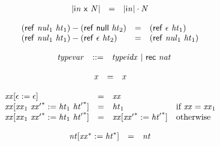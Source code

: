 $$
\begin{array}{@{}lcl@{}l@{}}
{|{\mathsf{i}}{{\mathit{n}}}~\mathsf{x}~{\mathit{N}}|} &=& {|{\mathsf{i}}{{\mathit{n}}}|} \cdot {\mathit{N}} &  \\
\end{array}
$$

\vspace{1ex}

$$
\begin{array}{@{}lcl@{}l@{}}
(\mathsf{ref}~{\mathit{nul}}_{{1}}~{\mathit{ht}}_{{1}}) - (\mathsf{ref}~\mathsf{null}~{\mathit{ht}}_{{2}}) &=& (\mathsf{ref}~\epsilon~{\mathit{ht}}_{{1}}) &  \\
(\mathsf{ref}~{\mathit{nul}}_{{1}}~{\mathit{ht}}_{{1}}) - (\mathsf{ref}~\epsilon~{\mathit{ht}}_{{2}}) &=& (\mathsf{ref}~{\mathit{nul}}_{{1}}~{\mathit{ht}}_{{1}}) &  \\
\end{array}
$$

\vspace{1ex}

$$
\begin{array}{@{}lrrl@{}l@{}}
& {\mathit{typevar}} &::=& {\mathit{typeidx}} ~|~ \mathsf{rec}~{\mathit{nat}} \\
\end{array}
$$

$$
\begin{array}{@{}lcl@{}l@{}}
{\mathit{x}} &=& {\mathit{x}} &  \\
\end{array}
$$

\vspace{1ex}

\vspace{1ex}

$$
\begin{array}{@{}lcl@{}l@{}}
{{\mathit{xx}}}{[\epsilon := \epsilon]} &=& {\mathit{xx}} &  \\
{{\mathit{xx}}}{[{\mathit{xx}}_{{1}}~{{\mathit{xx}'}^\ast} := {\mathit{ht}}_{{1}}~{{\mathit{ht}'}^\ast}]} &=& {\mathit{ht}}_{{1}} &\quad
  \mbox{if}~{\mathit{xx}} = {\mathit{xx}}_{{1}} \\
{{\mathit{xx}}}{[{\mathit{xx}}_{{1}}~{{\mathit{xx}'}^\ast} := {\mathit{ht}}_{{1}}~{{\mathit{ht}'}^\ast}]} &=& {{\mathit{xx}}}{[{{\mathit{xx}'}^\ast} := {{\mathit{ht}'}^\ast}]} &\quad
  \mbox{otherwise} \\
\end{array}
$$

$$
\begin{array}{@{}lcl@{}l@{}}
{{\mathit{nt}}}{[{{\mathit{xx}}^\ast} := {{\mathit{ht}}^\ast}]} &=& {\mathit{nt}} &  \\
\end{array}
$$

